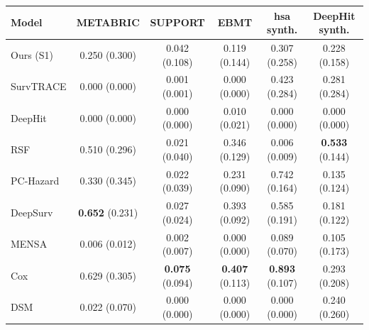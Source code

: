 \begin{tabular}{lccccc}
\toprule
Model & METABRIC & SUPPORT & EBMT & hsa synth. & DeepHit synth. \\
\midrule
Ours (S1) & 0.250 (0.300) & 0.042 (0.108) & 0.119 (0.144) & 0.307 (0.258) & 0.228 (0.158) \\
SurvTRACE & 0.000 (0.000) & 0.001 (0.001) & 0.000 (0.000) & 0.423 (0.284) & 0.281 (0.284) \\
DeepHit & 0.000 (0.000) & 0.000 (0.000) & 0.010 (0.021) & 0.000 (0.000) & 0.000 (0.000) \\
RSF & 0.510 (0.296) & 0.021 (0.040) & 0.346 (0.129) & 0.006 (0.009) & \textbf{0.533} (0.144) \\
PC-Hazard & 0.330 (0.345) & 0.022 (0.039) & 0.231 (0.090) & 0.742 (0.164) & 0.135 (0.124) \\
DeepSurv & \textbf{0.652} (0.231) & 0.027 (0.024) & 0.393 (0.092) & 0.585 (0.191) & 0.181 (0.122) \\
MENSA & 0.006 (0.012) & 0.002 (0.007) & 0.000 (0.000) & 0.089 (0.070) & 0.105 (0.173) \\
Cox & 0.629 (0.305) & \textbf{0.075} (0.094) & \textbf{0.407} (0.113) & \textbf{0.893} (0.107) & 0.293 (0.208) \\
DSM & 0.022 (0.070) & 0.000 (0.000) & 0.000 (0.000) & 0.000 (0.000) & 0.240 (0.260) \\
\bottomrule
\end{tabular}
